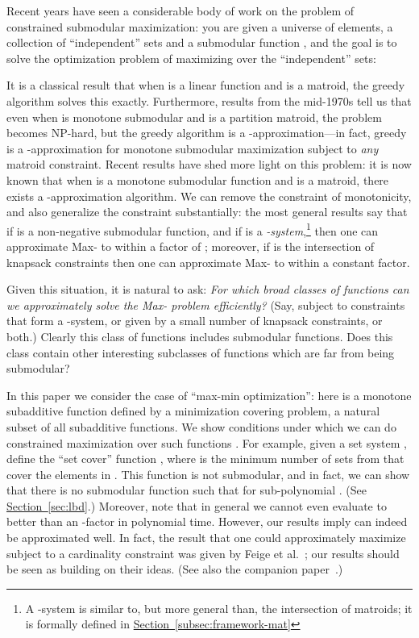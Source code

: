 \documentclass[11pt,letterpaper]{article}
\newcommand{\lref}[2][]{\hyperref[#2]{#1~\ref*{#2}}}
\newcounter{note}[section]
\begin{document}
\newcommand{\maxf}{\textsf{Max-}\xspace}

Recent years have seen a considerable body of work on the problem of constrained submodular maximization: you are given
a universe  of elements, a collection  of ``independent'' sets and a submodular function , and the goal is to solve the optimization problem of maximizing  over the ``independent'' sets:

It is a classical result that when  is a linear function and  is a matroid, the greedy algorithm solves
this exactly. Furthermore, results from the mid-1970s tell us that even when  is monotone submodular and 
is a partition matroid, the problem becomes NP-hard, but the greedy algorithm is a -approximation---in
fact, greedy is a -approximation for monotone submodular maximization subject to \emph{any} matroid constraint.
Recent results have shed more light on this problem: it is now known that when  is a monotone submodular function
and  is a matroid, there exists a -approximation algorithm. We can remove the constraint of
monotonicity, and also generalize the constraint  substantially: the most general results say that if  is a
non-negative submodular function, and if  is a \emph{-system},\footnote{A -system is
  similar to, but more general than, the intersection of  matroids;
  it is formally defined in \lref[Section]{subsec:framework-mat}} then one
can approximate \maxf to within a factor of ; moreover, if  is the intersection of  knapsack
constraints then one can approximate \maxf to within a constant factor.

Given this situation, it is natural to ask: \emph{For which broad
  classes of functions can we approximately solve the \textsf{Max-}
  problem efficiently?} (Say, subject to constraints  that form a
-system, or given by a small number of knapsack constraints, or
both.) Clearly this class of functions includes submodular functions.
Does this class contain other interesting subclasses of functions which
are far from being submodular?

In this paper we consider the case of ``max-min optimization'': here 
is a monotone subadditive function defined by a minimization covering
problem, a natural subset of all subadditive functions. We show
conditions under which we can do constrained maximization over such
functions .  For example, given a set system , define the
``set cover'' function , where  is
the minimum number of sets from  that cover the elements in
. This function  is not submodular, and in fact, we can show
that there is no submodular function  such that  for sub-polynomial . (See
\lref[Section]{sec:lbd}.) Moreover, note that in general we cannot even
evaluate  to better than an -factor in polynomial
time.  However, our results imply  can indeed
be approximated well.  In fact, the result that one could approximately
maximize  subject to a cardinality constraint was given by Feige
et al.~\cite{FJMM07}; our results should be seen as building on their
ideas. (See also the companion paper~\cite{GNR-k-rob}.)
\end{document}
